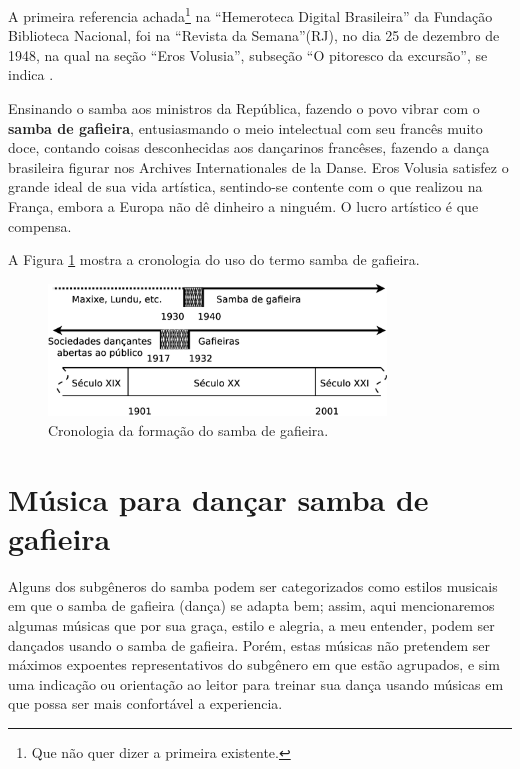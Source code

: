 A primeira referencia achada\footnote{Que não quer dizer a primeira existente.} 
na ``Hemeroteca Digital Brasileira'' da Fundação Biblioteca Nacional,
foi na ``Revista da Semana''(RJ), no dia 25 de dezembro de 1948,
na qual na seção ``Eros Volusia'', subseção ``O pitoresco da excursão'', se indica \cite[pp. 48]{sambagafieirarefbn}.
\begin{citando}
Ensinando o samba aos ministros da República, 
fazendo o povo vibrar com o \textbf{samba de gafieira}, entusiasmando
o meio intelectual com seu francês muito doce,
contando coisas desconhecidas aos dançarinos francêses,
fazendo a dança brasileira figurar nos Archives Internationales de la Danse.
Eros Volusia satisfez o grande ideal de sua vida artística, sentindo-se contente
com o que realizou na França, embora a Europa não dê dinheiro a ninguém.
O lucro artístico é que compensa.
\end{citando}


A Figura \ref{fig:sambagafieiracrono} mostra a cronologia do uso do termo samba de gafieira. 

\begin{figure}[h]
  \centering
    \includegraphics[width=0.8\textwidth]{chapters/cap-historia-sambagafieira/gafieira-crono.eps}
  \caption{ Cronologia da formação do samba de gafieira.}
\label{fig:sambagafieiracrono}
\end{figure}

\section{Música para dançar samba de gafieira}
\label{subsec:gafieiradancaestilos}

Alguns dos subgêneros do samba podem ser categorizados como estilos musicais em que o samba de gafieira (dança) se adapta bem; 
assim,
aqui mencionaremos algumas músicas que por sua graça, estilo e alegria,
a meu entender, podem ser dançados usando o samba de gafieira. Porém, 
estas músicas não pretendem ser máximos expoentes representativos do subgênero em que estão agrupados,
e sim uma indicação ou orientação ao leitor para treinar sua dança usando músicas em que possa ser mais confortável a experiencia.


